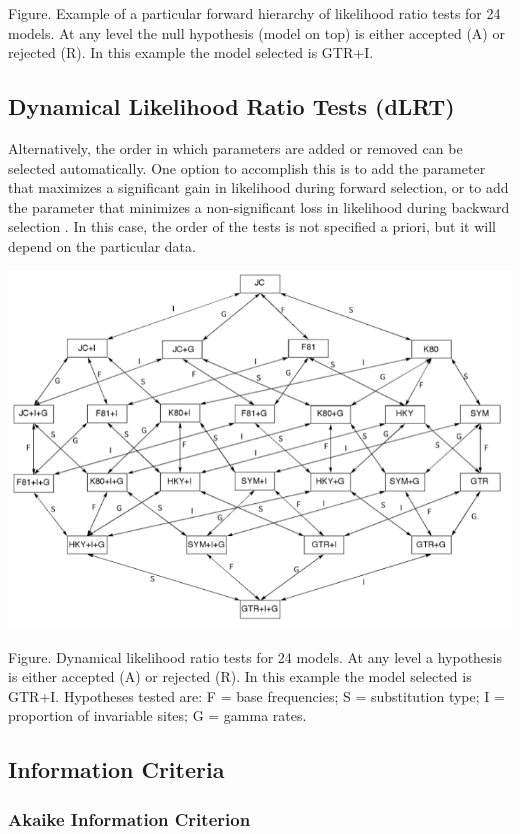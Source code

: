 Figure. Example of a particular forward hierarchy of likelihood ratio tests for 24 models. At any level the null hypothesis (model on top) is either accepted (A) or rejected (R). In this example the model selected is GTR+I.

\subsection{Dynamical Likelihood Ratio Tests (dLRT)}
\label{sec:dlrt}

Alternatively, the order in which parameters are added or removed can be selected automatically. One option to accomplish this is to add the parameter that maximizes a significant gain in likelihood during forward selection, or to add the parameter that minimizes a non-significant loss in likelihood during backward selection \citep{Posada-2001a}. In this case, the order of the tests is not specified a priori, but it will depend on the particular data.

\begin{center}
\includegraphics[width=.9\textwidth]{images/dLRT.png}
\end{center}

Figure. Dynamical likelihood ratio tests for 24 models. At any level a hypothesis is either accepted (A) or rejected (R). In this example the model selected is GTR+I. Hypotheses tested are: F = base frequencies; S = substitution type; I = proportion of invariable sites; G = gamma rates.

\subsection{Information Criteria}
\subsubsection{Akaike Information Criterion}
\label{sec:aic}

